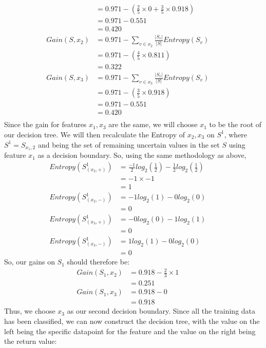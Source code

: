 \documentclass[12pt]{article} %
\begin{document}
\begin{flushleft}
\begin{enumerate}
\begin{align*}
			&= 0.971 - (\frac{2}{5} \times 0 + \frac{3}{5} \times 0.918) &&\\
			&= 0.971 - 0.551 &&\\
			&= 0.420 &&\\
			Gain(S, x_2) &= 0.971 - \sum_{v\in x_2} \frac{|S_v|}{|S|}Entropy(S_v) &&\\
			&= 0.971 - (\frac{4}{5}\times0.811) &&\\
			&= 0.322 &&\\
			Gain(S, x_3) &= 0.971 - \sum_{v\in x_3} \frac{|S_v|}{|S|}Entropy(S_v) &&\\
			&= 0.971 - ( \frac{3}{5} \times 0.918) &&\\
			&= 0.971 - 0.551 &&\\
			&= 0.420 &&\\
		\end{align*}
			Since the gain for features $x_1, x_3$ are the same, we will choose $x_1$ to be the root of our decision tree. We will then recalculate the Entropy of $x_2, x_3$ on $S^1$, where $S^1 = S_{x_1, 2}$ and being the set of remaining uncertain values in the set $S$ using feature $x_1$ as a decision boundary. So, using the same methodology as above,
		\begin{align*}
			Entropy(S^1_{(x_2, +)}) &= \frac{-1}{2}log_2(\frac{1}{2}) - \frac{1}{2}log_2(\frac{1}{2}) &&\\
			&= -1\times-1 &&\\
			&= 1 &&\\
			Entropy(S^1_{(x_2, -)}) &= -1 log_2(1) - 0 log_2(0) &&\\
			&= 0 &&\\
			Entropy(S^1_{(x_3, +)}) &= -0 log_2(0) - 1log_2(1) &&\\
			&= 0 &&\\
			Entropy(S^1_{(x_3, -)}) &= 1 log_2(1) - 0log_2(0) &&\\
			&= 0
		\end{align*}
		So, our gains on $S_1$ should therefore be:
		\begin{align*}
			Gain(S_1, x_2) &= 0.918 - \frac{2}{3} \times 1 &&\\
			&= 0.251 &&\\
			Gain(S_1, x_3) &= 0.918 - 0 &&\\
			&= 0.918
		\end{align*}
		Thus, we choose $x_3$ as our second decision boundary. Since all the training data has been classified, we can now construct the decision tree, with the value on the left being the specific datapoint for the feature and the value on the right being the return value:\\

\end{enumerate}
\end{flushleft}
\end{document}
